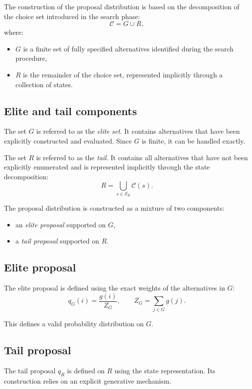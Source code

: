 \documentclass[11pt]{article}
\begin{document}
The construction of the proposal distribution is based on the decomposition of the choice set introduced in the search phase:
\[
\mathcal{C} = G \cup R,
\]
where:
\begin{itemize}
\item $G$ is a finite set of fully specified alternatives identified during the search procedure,
\item $R$ is the remainder of the choice set, represented implicitly through a collection of states.
\end{itemize}

\subsection{Elite and tail components}

The set $G$ is referred to as the \emph{elite set}. It contains alternatives that have been explicitly constructed and evaluated. Since $G$ is finite, it can be handled exactly.

The set $R$ is referred to as the \emph{tail}. It contains all alternatives that have not been explicitly enumerated and is represented implicitly through the state decomposition:
\[
R = \bigcup_{s \in \mathcal{S}_R} \mathcal{C}(s).
\]

The proposal distribution is constructed as a mixture of two components:
\begin{itemize}
\item an \emph{elite proposal} supported on $G$,
\item a \emph{tail proposal} supported on $R$.
\end{itemize}

\subsection{Elite proposal}

The elite proposal is defined using the exact weights of the alternatives in $G$:
\[
q_G(i) = \frac{g(i)}{Z_G}, \qquad Z_G = \sum_{j \in G} g(j).
\]

This defines a valid probability distribution on $G$.

\subsection{Tail proposal}

The tail proposal $q_R$ is defined on $R$ using the state representation. Its construction relies on an explicit generative mechanism.
\end{document}
